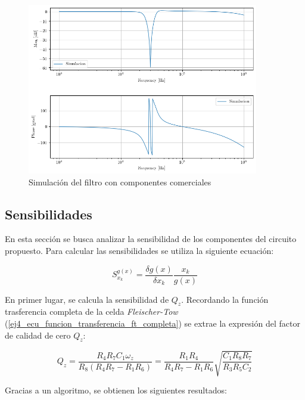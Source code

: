 \begin{figure}[h!]                                                       
    \centering\includegraphics[width=0.9\textwidth]{../Ex4/Resources/ej4_bode_sim.png}
    \caption{Simulación del filtro con componentes comerciales}
    \label{ej4_simulacion_comerciales}
    \end{figure}


\subsection{Sensibilidades}

En esta sección se busca analizar la sensibilidad de los componentes del circuito propuesto. Para calcular las sensibilidades se utiliza la siguiente ecuación:

\begin{displaymath}  S^{g(x)}_{x_k} = \frac{\delta g(x)} {\delta x_k} \frac{x_k}{g(x)}\end{displaymath}
    
En primer lugar, se calcula la sensibilidad de $Q_z$. Recordando la función trasferencia completa de la celda \textit{Fleischer-Tow} (\ref{ej4_ecu_funcion_transferencia_ft_completa}) se extrae la expresión del factor de calidad de cero $Q_z$:

\begin{displaymath} Q_z = \frac{R_4 R_7 C_1 \omega_z}{R_8 (R_4 R_7 - R_1 R_6)} = \frac{R_1 R_4}{R_4 R_7 - R_1 R_6} \sqrt{\frac{C_1 R_8 R_7}{R_3 R_5 C_2}}\end{displaymath}

Gracias a un algoritmo, se obtienen los siguientes resultados:

